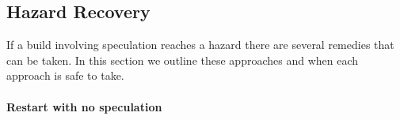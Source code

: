 \begin{comment}

\subsection{Additional commands have no effect}
\label{sec:proof:additional}

Given a script with no hazards when executed sequentially, we can show that speculating unnecessary commands will not affect the build's output. %

Proof by induction.

Let us assume we have a build $A$ which has no hazards when executed sequentially.

Base case:  Build $A$ has 1 command $c$.  Let us assume we have a command $d$ that does not write to any file read or written by $c$.  By this definition of $d$, it is obvious that $d$ running before or
concurrently with $c$ as part of build $A$, will not affect the files written by $c$ and therefore will not affect the output of $A$.

Inductive case: Let us assume the above claim is true for a build with $n$ commands.  Let us show the claim is true for a build of $n+1$ commands.

Let $A$ have $n+1$ command.  From the inductive hypothesis we know the output of the first $n$ commands is unchanged.  And, we know that $c$ does not write to any file read or written by command $n+1$.  And, because the build has no hazards, all files read by $n+1$ were written to before $n+1$ ran, so the output files of $n+1$ remain unchanged as well.  Therefore, the output of $A$ remained unaffected by $c$.
\end{comment}

\subsection{Hazard Recovery}
\label{sec:proof:classify_hazard}

If a build involving speculation reaches a hazard there are several remedies that can be taken. In this section we outline these approaches and when each approach is safe to take.

\paragraph{Restart with no speculation}
\label{sec:proof:restart_no_speculation}

